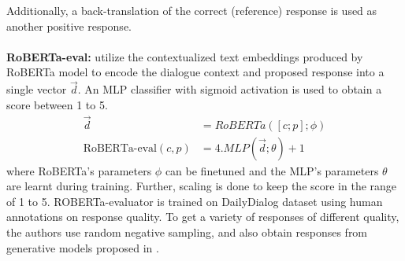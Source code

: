 Additionally, a back-translation of the correct (reference) response is used as another positive response.\\
\\
\textbf{RoBERTa-eval:}  utilize the contextualized text embeddings produced by RoBERTa model to encode the dialogue context and proposed response into a single vector $\overrightarrow{d}$. An MLP classifier with sigmoid activation is used to obtain a score between 1 to 5.\\
\begin{align*}
    \overrightarrow{d} &= RoBERTa([c;p];\phi)\\
    \text{RoBERTa-eval}(c,p) &= 4. MLP(\overrightarrow{d};\theta) + 1
\end{align*}
where RoBERTa's parameters $\phi$ can be finetuned and the MLP's parameters $\theta$ are learnt during training. Further, scaling is done to keep the score in the range of 1 to 5. 
ROBERTa-evaluator is trained on DailyDialog dataset  using human annotations on response quality. To get a variety of responses of different quality, the authors use random negative sampling, and also obtain responses from generative models proposed in .
    \centering
